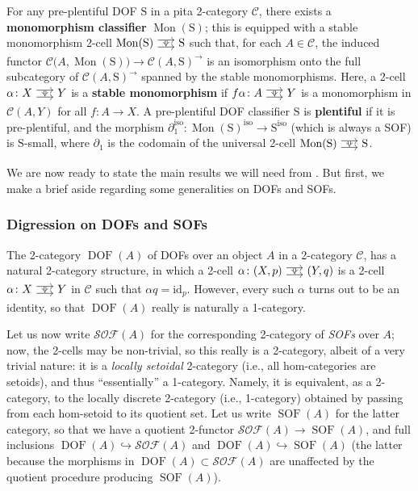 \documentclass{amsart}
\newcommand\cC{\mathcal{C}}
\newcommand\defword[1]{{\boldmath \textbf{#1}}}
\newcommand\DOF{\operatorname{DOF}}
\newcommand\hto{\hookrightarrow}
\newcommand\id{\mathrm{id}}
\newcommand\iso{\mathrm{iso}}
\newcommand\Mon{\operatorname{Mon}}
\newcommand\pbig[1]{\big({#1}\big)}
\newcommand\rS{\mathrm{S}}
\newcommand\SOF{\operatorname{SOF}}
\newcommand\SSOF{\mathcal{SOF}}
\newcommand\tocell{\hspace{-5pt}\begin{tikzcd}[column sep=15pt, ampersand replacement=\&]{}\ar[r, shift left=3pt, ""{name=top}]\ar[r, shift right=3pt, ""'{name=bot}, start anchor=east, end anchor=west]\&{}\ar[Rightarrow, from=top, to=bot, shorten=0.5pt]\end{tikzcd}\hspace{-5pt}}
\theoremstyle{definition}
\theoremstyle{remark}
\theoremstyle{plainwithref}
\begin{document}
For any pre-plentiful DOF \( \rS \) in a pita 2-category \( \cC \), there exists a \defword{monomorphism classifier} \( \Mon(\rS) \); this is equipped with a stable monomorphism 2-cell \( \Mon(\rS) \tocell \rS \) such that, for each \( A \in \cC \), the induced functor \( \cC\pbig{A, \Mon(\rS)} \to \cC(A, \rS)^\to \) is an isomorphism onto the full subcategory of \( \cC(A, \rS)^\to \) spanned by the stable monomorphisms.
Here, a 2-cell \( \alpha \colon X \tocell Y \) is a \defword{stable monomorphism} if \( f \alpha \colon A \tocell Y \) is a monomorphism in \( \cC(A, Y) \) for all \( f \colon A \to X \).
A pre-plentiful DOF classifier \( \rS \) is \defword{plentiful} if it is pre-plentiful, and the morphism \( \partial_1^\iso \colon \Mon(\rS)^\iso \to \rS^\iso \) (which is always a SOF) is \( \rS \)-small, where \( \partial_1 \) is the codomain of the universal 2-cell \(  \Mon(\rS) \tocell \rS \).

We are now ready to state the main results we will need from \cite{helfer-topoi-in-topoi}.
But first, we make a brief aside regarding some generalities on DOFs and SOFs.

\subsubsection{Digression on DOFs and SOFs} \label{subsubsec:dof-sof-digression}
The 2-category \( \DOF(A) \) of DOFs over an object \( A \) in a 2-category \( \cC \), has a natural 2-category structure, in which a 2-cell \( \alpha \colon (X, p) \tocell  (Y, q) \) is a 2-cell \( \alpha \colon X \tocell Y \) in \( \cC \) such that \( \alpha q = \id_{p} \).
However, every such \( \alpha \) turns out to be an identity, so that \( \DOF(A) \) really is naturally a 1-category.

Let us now write \( \SSOF(A) \) for the corresponding 2-category of \emph{SOFs} over \( A \); now, the 2-cells may be non-trivial, so this really is a 2-category, albeit of a very trivial nature: it is a \emph{locally setoidal} 2-category (i.e., all hom-categories are setoids), and thus ``essentially'' a 1-category.
Namely, it is equivalent, as a 2-category, to the locally discrete 2-category (i.e., 1-category) obtained by passing from each hom-setoid to its quotient set.
Let us write \( \SOF(A) \) for the latter category, so that we have a quotient 2-functor \( \SSOF(A) \to \SOF(A) \), and full inclusions \( \DOF(A) \hto \SSOF(A) \) and \( \DOF(A) \hto \SOF(A) \) (the latter because the morphisms in \( \DOF(A) \subset \SSOF(A) \) are unaffected by the quotient procedure producing \( \SOF(A) \)).
\end{document}
